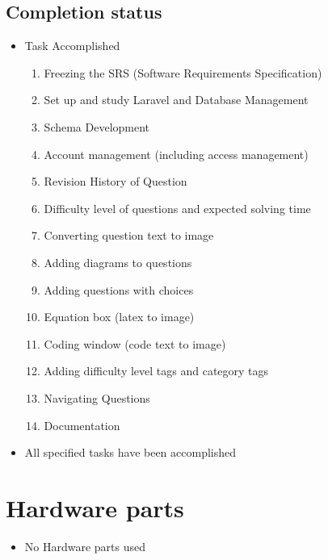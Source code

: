 \documentclass[a4paper,12pt,oneside]{book}
\begin{document}
\vspace{2in}

\subsection*{Completion status}
\begin{itemize}
	\item Task Accomplished
		\begin{enumerate}
			\item Freezing the SRS (Software Requirements Specification) 
			\item Set up and study Laravel and Database Management
			\item Schema Development
			\item Account management (including access management)
			\item Revision History of Question
			\item Difficulty level of questions and expected solving time 
			\item Converting question text to image
			\item Adding diagrams to questions 
			\item Adding questions with choices 
			\item Equation box (latex to image) 
			\item Coding window (code text to image)
			\item Adding difficulty level tags and category tags 
			\item Navigating Questions
			\item Documentation
		\end{enumerate}
	\item All specified tasks have been accomplished 	
\end{itemize}

\vspace{1.5in}
\section{Hardware parts}
\begin{itemize}
  \item No Hardware  parts used
\end{itemize}
\end{document}
